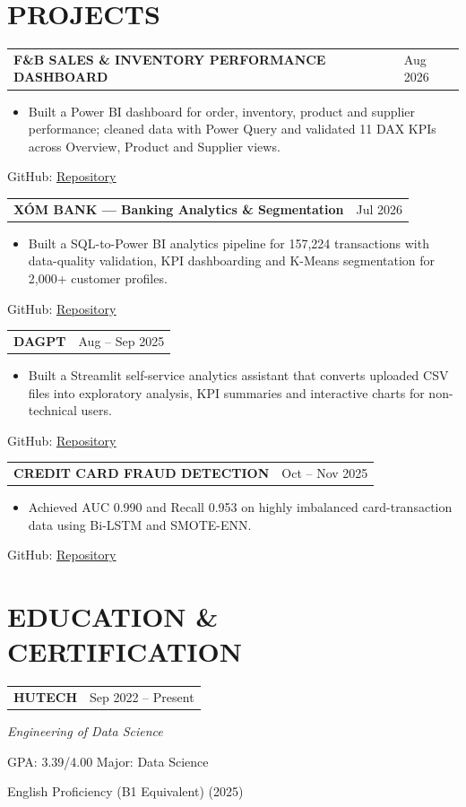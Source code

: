 \documentclass[10pt,letterpaper]{article}
\makeatletter
\newcommand{\cvsection}[2]{\section*{\faIcon{#1}\hspace{0.45em}#2}}
\newcommand{\cvlink}[2]{\href{#1}{\underline{#2}}}
\newcommand{\projectentry}[4]{%
  \begin{tabularx}{\textwidth}{@{}X>{\raggedleft\arraybackslash}p{1.52in}@{}}
    \textbf{#1} & \normalsize #2 \\
  \end{tabularx}\par
  \begin{itemize}[leftmargin=1.75em,itemsep=0em,topsep=0.08em,parsep=0em,partopsep=0em]
    \item \small #3
  \end{itemize}
  \small\hspace{1.15em}GitHub: \cvlink{#4}{Repository}\par
}
\makeatother
\begin{document}
\cvsection{briefcase}{PROJECTS}
\projectentry{F\&B SALES \& INVENTORY PERFORMANCE DASHBOARD}{Aug 2026}{Built a Power BI dashboard for order, inventory, product and supplier performance; cleaned data with Power Query and validated 11 DAX KPIs across Overview, Product and Supplier views.}{https://github.com/lehoanggiavi/F-B-Supply-Chain}
\vspace{0.16em}
\projectentry{XÓM BANK --- Banking Analytics \& Segmentation}{Jul 2026}{Built a SQL-to-Power BI analytics pipeline for 157,224 transactions with data-quality validation, KPI dashboarding and K-Means segmentation for 2,000+ customer profiles.}{https://github.com/lehoanggiavi/Banking}
\vspace{0.16em}
\projectentry{DAGPT}{Aug -- Sep 2025}{Built a Streamlit self-service analytics assistant that converts uploaded CSV files into exploratory analysis, KPI summaries and interactive charts for non-technical users.}{https://github.com/lehoanggiavi/dagpt}
\vspace{0.16em}
\projectentry{CREDIT CARD FRAUD DETECTION}{Oct -- Nov 2025}{Achieved AUC 0.990 and Recall 0.953 on highly imbalanced card-transaction data using Bi-LSTM and SMOTE-ENN.}{https://github.com/lehoanggiavi/ccfd}

\cvsection{graduation-cap}{EDUCATION \& CERTIFICATION}
\begin{tabularx}{\textwidth}{@{}X>{\raggedleft\arraybackslash}p{1.52in}@{}}
  \textbf{HUTECH} & \normalsize Sep 2022 -- Present \\
\end{tabularx}\par
\small\textit{Engineering of Data Science}\par
\small GPA: 3.39/4.00 \quad\textbullet\quad Major: Data Science\par
\small English Proficiency (B1 Equivalent) (2025)
\end{document}
